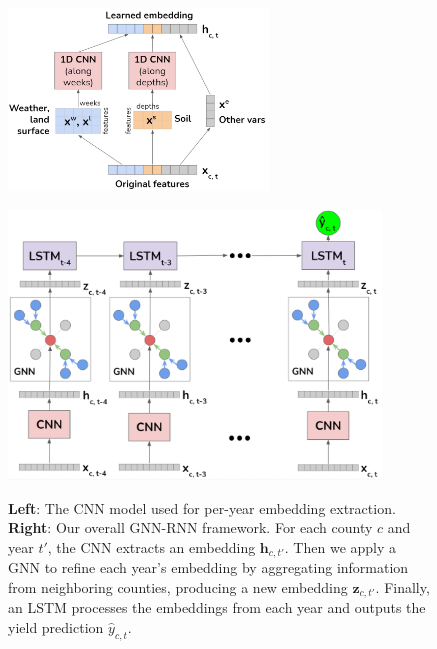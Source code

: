 \begin{figure}[t]
\centering
\begin{minipage}[c]{7cm}
\includegraphics[width=6.9cm]{figs/cnn.png}
\label{fig:cnn}
\end{minipage}
\begin{minipage}[c]{10cm}
\includegraphics[width=9.9cm]{figs/gnn-rnn.png}
\label{fig:gnn-rnn}
\end{minipage}
\caption{\textbf{Left}: The CNN model used for per-year embedding extraction. \textbf{Right}: Our overall GNN-RNN framework. For each county $c$ and year $t'$, the CNN extracts an embedding $\mathbf{h}_{c, t'}$. Then we apply a GNN to refine each year's embedding by aggregating information from neighboring counties, producing a new embedding $\mathbf{z}_{c, t'}$. Finally, an LSTM processes the embeddings from each year and outputs the yield prediction $\widehat{y}_{c, t}$.}
\end{figure}


